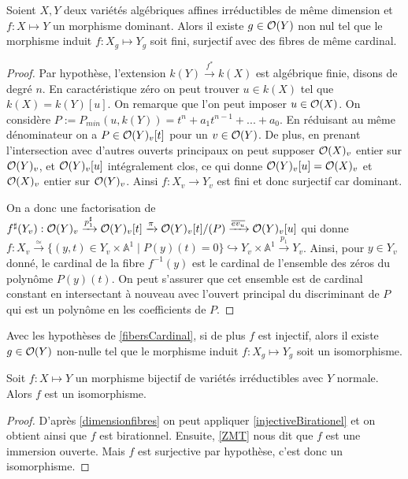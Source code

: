 \begin{prop}\label{fibersCardinal}
Soient $X,Y$ deux variétés algébriques affines irréductibles de même dimension et $f:X \mapsto Y$ un morphisme dominant. Alors il existe $g\in \mathcal{O}(Y)$ non nul tel que le morphisme induit $f:X_g \mapsto Y_g$ soit fini, surjectif avec des fibres de même cardinal.
\end{prop}
\begin{proof}
Par hypothèse, l'extension $k(Y) \xrightarrow{f^*} k(X)$ est algébrique finie, disons de degré $n$. En caractéristique zéro on peut trouver $u\in k(X)$ tel que $k(X)=k(Y)[u]$. On remarque que l'on peut imposer $u\in \mathcal{O}(X)$. On considère $P:=P_{min}(u, k(Y))=t^n+a_1t^{n-1}+...+a_0$. En réduisant au même dénominateur on a $P\in \mathcal{O}(Y)_v[t]$ pour un $v\in \mathcal{O}(Y)$. De plus, en prenant l'intersection avec d'autres ouverts principaux on peut supposer $\mathcal{O}(X)_v$ entier sur $\mathcal{O}(Y)_v$, et $\mathcal{O}(Y)_v[u]$ intégralement clos, ce qui donne $\mathcal{O}(Y)_v[u]=\mathcal{O}(X)_v$ et $\mathcal{O}(X)_v$ entier sur $\mathcal{O}(Y)_v$. Ainsi $f:X_v \rightarrow Y_v$ est fini et donc surjectif car dominant.

On a donc une factorisation de $f^\sharp(Y_v):\mathcal{O}(Y)_v\xrightarrow{p_1^\sharp}\mathcal{O}(Y)_v[t]\xrightarrow{\pi}\mathcal{O}(Y)_v[t]/(P)\xrightarrow{\overline{ev_u}}\mathcal{O}(Y)_v[u]$ qui donne $f:X_v \xrightarrow{\simeq} \lbrace (y,t) \in Y_v\times \mathbb{A}^1\mid P(y)(t)=0\rbrace \hookrightarrow Y_v\times \mathbb{A}^1 \xrightarrow{p_1} Y_v$. Ainsi, pour $y\in Y_v$ donné, le cardinal de la fibre $f^{-1}(y)$ est le cardinal de l'ensemble des zéros du polynôme $P(y)(t)$. On peut s'assurer que cet ensemble est de cardinal constant en intersectant à nouveau avec l'ouvert principal du discriminant de $P$ qui est un polynôme en les coefficients de $P$.
\end{proof}

\begin{cor}\label{injectiveBirationel}
Avec les hypothèses de \ref{fibersCardinal}, si de plus $f$ est injectif, alors il existe $g\in \mathcal{O}(Y)$ non-nulle tel que le morphisme induit $f:X_g \mapsto Y_g$ soit un isomorphisme.
\end{cor}

\begin{thm}\label{ZMTCor}
Soit $f:X \mapsto Y$ un morphisme bijectif de variétés irréductibles avec $Y$ normale. Alors $f$ est un isomorphisme.
\end{thm}
\begin{proof}
D'après \ref{dimensionfibres} on peut appliquer \ref{injectiveBirationel} et on obtient ainsi que $f$ est birationnel. Ensuite, \ref{ZMT} nous dit que $f$ est une immersion ouverte. Mais $f$ est surjective par hypothèse, c'est donc un isomorphisme.
\end{proof}

